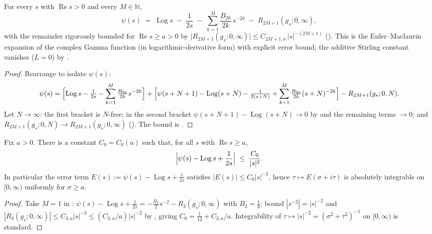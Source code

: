 \begin{theorem}
\label{thm:gs_digamma_stirling}
\leanok
{}
For every $s$ with $\operatorname{Re}s>0$ and every $M\in\mathbb{N}$,
\[
  \psi(s) \;=\; \operatorname{Log}s \;-\; \frac{1}{2s}
    \;-\; \sum_{k=1}^{M}\frac{B_{2k}}{2k}\,s^{-2k}
    \;-\; R_{2M+1}(g_s;0,\infty) ,
\]
with the remainder rigorously bounded for $\operatorname{Re}s\ge a>0$ by
$\bigl|R_{2M+1}(g_s;0,\infty)\bigr|\le C_{2M+1,a}\,\lvert s\rvert^{-(2M+1)}$
(). This is the Euler--Maclaurin expansion of the
complex Gamma function (in logarithmic-derivative form) with explicit error bound;
the additive Stirling constant vanishes ($L=0$) by .
\end{theorem}

\begin{proof}
\leanok
{}
Rearrange  to isolate $\psi(s)$:
\[
  \psi(s) = \Bigl[\operatorname{Log}s-\tfrac1{2s}
    -\sum_{k=1}^{M}\tfrac{B_{2k}}{2k}s^{-2k}\Bigr]
    + \Bigl[\psi(s+N+1)-\operatorname{Log}(s+N)-\tfrac1{2(s+N)}
       +\sum_{k=1}^{M}\tfrac{B_{2k}}{2k}(s+N)^{-2k}\Bigr]
    - R_{2M+1}(g_s;0,N).
\]
Let $N\to\infty$: the first bracket is $N$-free; in the second bracket
$\psi(s+N+1)-\operatorname{Log}(s+N)\to 0$ by  and the remaining
terms $\to0$; and $R_{2M+1}(g_s;0,N)\to R_{2M+1}(g_s;0,\infty)$
(). The bound is .
\end{proof}

\begin{corollary}
\label{cor:gs_digamma_first_order}
\leanok
{}
Fix $a>0$. There is a constant $C_0=C_0(a)$ such that, for all $s$ with
$\operatorname{Re}s\ge a$,
\[
  \Bigl|\psi(s)-\operatorname{Log}s+\frac{1}{2s}\Bigr|
  \;\le\; \frac{C_0}{\lvert s\rvert^{2}} .
\]
In particular the error term $E(s):=\psi(s)-\operatorname{Log}s+\tfrac1{2s}$
satisfies $|E(s)|\le C_0|s|^{-2}$, hence $\tau\mapsto E(\sigma+i\tau)$ is absolutely
integrable on $[0,\infty)$ uniformly for $\sigma\ge a$.
\end{corollary}

\begin{proof}
\leanok
{}
Take $M=1$ in :
$\psi(s)-\operatorname{Log}s+\tfrac1{2s}=-\tfrac{B_2}{2}s^{-2}-R_3(g_s;0,\infty)$
with $B_2=\tfrac16$; bound $|s^{-2}|=|s|^{-2}$ and
$|R_3(g_s;0,\infty)|\le C_{3,a}|s|^{-3}\le (C_{3,a}/a)|s|^{-2}$ by
, giving $C_0=\tfrac1{12}+C_{3,a}/a$. Integrability of
$\tau\mapsto|s|^{-2}=(\sigma^2+\tau^2)^{-1}$ on $[0,\infty)$ is standard.
\end{proof}

